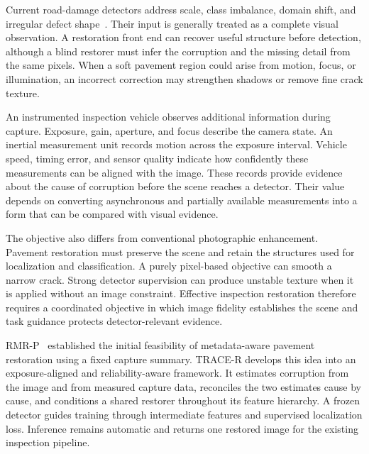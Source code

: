 \documentclass[journal]{IEEEtran}
\begin{document}
Current road-damage detectors address scale, class imbalance, domain shift, and irregular defect shape~\cite{arya2022rdd2022,lin2023dardd,li2024yoloxrdd,zhang2024shapeadaptation}. Their input is generally treated as a complete visual observation. A restoration front end can recover useful structure before detection, although a blind restorer must infer the corruption and the missing detail from the same pixels. When a soft pavement region could arise from motion, focus, or illumination, an incorrect correction may strengthen shadows or remove fine crack texture.

An instrumented inspection vehicle observes additional information during capture. Exposure, gain, aperture, and focus describe the camera state. An inertial measurement unit records motion across the exposure interval. Vehicle speed, timing error, and sensor quality indicate how confidently these measurements can be aligned with the image. These records provide evidence about the cause of corruption before the scene reaches a detector. Their value depends on converting asynchronous and partially available measurements into a form that can be compared with visual evidence.

The objective also differs from conventional photographic enhancement. Pavement restoration must preserve the scene and retain the structures used for localization and classification. A purely pixel-based objective can smooth a narrow crack. Strong detector supervision can produce unstable texture when it is applied without an image constraint. Effective inspection restoration therefore requires a coordinated objective in which image fidelity establishes the scene and task guidance protects detector-relevant evidence.

RMR-P~\cite{ghorbani2026rmrp} established the initial feasibility of metadata-aware pavement restoration using a fixed capture summary. TRACE-R develops this idea into an exposure-aligned and reliability-aware framework. It estimates corruption from the image and from measured capture data, reconciles the two estimates cause by cause, and conditions a shared restorer throughout its feature hierarchy. A frozen detector guides training through intermediate features and supervised localization loss. Inference remains automatic and returns one restored image for the existing inspection pipeline.
\end{document}
